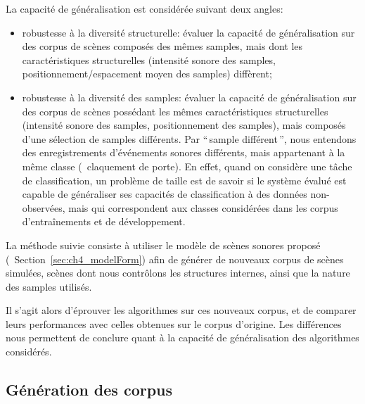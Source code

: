 La capacité de généralisation est considérée suivant deux angles:

\begin{itemize}
\item robustesse à la diversité structurelle: évaluer la capacité de généralisation sur des corpus de scènes composés des mêmes samples, mais dont les caractéristiques structurelles (intensité sonore des samples, positionnement/espacement moyen des samples) diffèrent;
\item robustesse à  la diversité des samples: évaluer la capacité de généralisation sur des corpus de scènes possédant les mêmes caractéristiques structurelles (intensité sonore des samples, positionnement des samples), mais composés d'une sélection de samples différents. Par ``\,sample différent\,'', nous entendons des enregistrements d'événements sonores différents, mais appartenant à la même classe (\eg~claquement de porte).  En effet, quand on considère une tâche de classification, un problème de taille est de savoir si le système évalué est capable de généraliser ses capacités de classification à des données non-observées, mais qui correspondent aux classes considérées dans les corpus d’entraînements et de développement.
\end{itemize}

La méthode suivie consiste à utiliser le modèle de scènes sonores proposé (\cf~Section~\ref{sec:ch4_modelForm}) afin de générer de nouveaux corpus de scènes simulées, scènes dont nous contrôlons les structures internes, ainsi que la nature des samples utilisés. 


Il s'agit alors d'éprouver les algorithmes sur ces nouveaux corpus, et de comparer leurs performances avec celles obtenues sur le corpus d'origine. Les différences nous permettent de conclure quant à la capacité de généralisation des algorithmes considérés.

\subsection{Génération des corpus}

